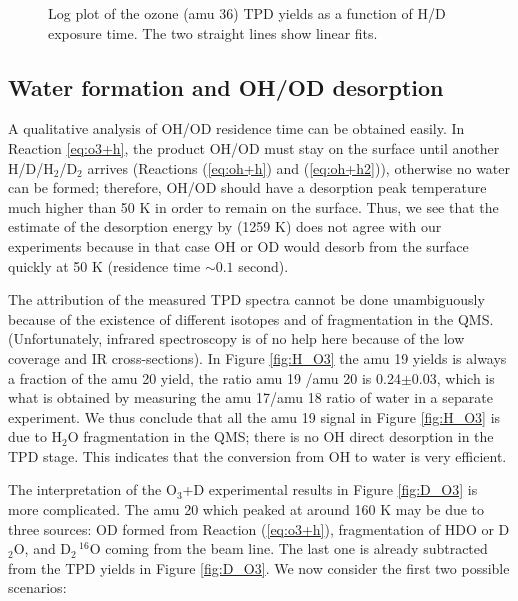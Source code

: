 \documentclass[iop]{emulateapj}
\begin{document}
\begin{figure}
\caption{Log plot of the ozone (amu 36) TPD yields as a function of H/D exposure time. The two straight lines show  linear fits. }
\label{fig:log_ozone}
\end{figure}

\subsection{Water formation and OH/OD desorption}
A qualitative analysis of OH/OD residence time can be obtained easily. In Reaction \ref{eq:o3+h}, the product OH/OD must stay on the surface until another H/D/H$_2$/D$_2$ arrives (Reactions (\ref{eq:oh+h}) and (\ref{eq:oh+h2})), otherwise no water can be formed; therefore, OH/OD should have a desorption peak temperature much higher than 50 K in order to remain on the surface. Thus, we see that the estimate of the desorption energy by  \citet{Allen1977} (1259 K) does not agree with our experiments because in that case OH or OD would desorb from the surface quickly at 50 K (residence time $\sim 0.1$ second). 

The attribution of the measured TPD spectra cannot be done unambiguously because of the existence of different isotopes and of fragmentation in the QMS. (Unfortunately, infrared spectroscopy is of no help here because of the low coverage and IR cross-sections). In Figure \ref{fig:H_O3} the amu 19 yields is always a fraction of the amu 20 yield, the ratio amu 19 /amu 20 is 0.24$\pm$0.03, which is what is obtained by measuring  the amu 17/amu 18 ratio of water in a separate experiment. We thus conclude that all the amu 19 signal  in Figure \ref{fig:H_O3} is due to H$_2$O fragmentation in the QMS; there is no OH direct desorption in the TPD stage. This indicates that the conversion from OH to water is very efficient.

The interpretation of the O$_3$+D experimental results in Figure \ref{fig:D_O3} is more complicated. The amu 20 which peaked at around 160 K may be due to three sources: OD formed from Reaction (\ref{eq:o3+h}),  fragmentation of HDO or D$_2$O, and D$_2 \, ^{16}$O coming from the beam line. The last one is already subtracted from the TPD yields in Figure \ref{fig:D_O3}. We now consider the first two possible scenarios:
\end{document}
